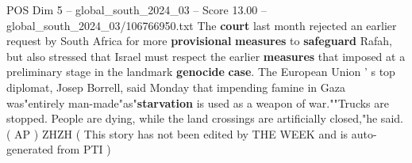 \begin{textsample}{POS Dim 5 – global\_south\_2024\_03 – Score 13.00 – global\_south\_2024\_03/106766950.txt}
The \textbf{court} last month rejected an earlier request by South Africa for more \textbf{provisional} \textbf{measures} to \textbf{safeguard} Rafah, but also stressed that Israel must respect the earlier \textbf{measures} that imposed at a preliminary stage in the landmark \textbf{genocide} \textbf{case}.
The European Union ' s top diplomat, Josep Borrell, said Monday that impending famine in Gaza was"entirely man-made"as"\textbf{starvation} is used as a weapon of war.""Trucks are stopped.
People are dying, while the land crossings are artificially closed,"he said. ( AP ) ZHZH ( This story has not been edited by THE WEEK and is auto-generated from PTI )

\end{textsample}
